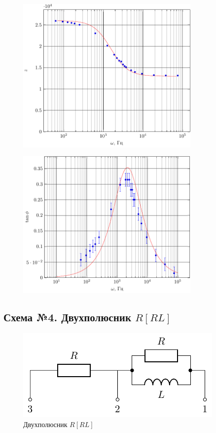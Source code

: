 
\begin{figure}[H]
	\centering
	\includegraphics[width=0.8\textwidth]{img/chem3_z}
	\label{fig:RRC_z}
\end{figure}
\begin{figure}[H]
	\centering
	\includegraphics[width=0.8\textwidth]{img/chem3_phi}
	\label{fig:RRC_tanphi}
\end{figure}


\subsection{Схема №4. Двухполюсник $R[RL]$}
\begin{figure}[H]
	\centering
	\includegraphics[]{chems/chem4}
	\caption{Двухполюсник $R[RL]$}
	\label{fig:RRL}
\end{figure}
